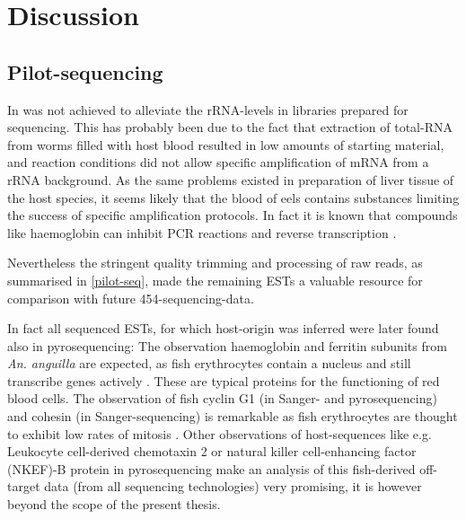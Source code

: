 
\chapter{Discussion} %



\ifpdf
    \graphicspath{{7_discussion/figures/PNG/}{7_discussion/figures/PDF/}{7_discussion/figures/}}
\else
    \graphicspath{{7_discussion/figures/EPS/}{7_discussion/figures/}}
\fi



\section{Pilot-sequencing}
\label{sec:sanger-pil}

In was not achieved to alleviate the rRNA-levels in libraries prepared
for sequencing. This has probably been due to the fact that extraction
of total-RNA from worms filled with host blood resulted in low amounts
of starting material, and reaction conditions did not allow specific
amplification of mRNA from a rRNA background. As the same problems
existed in preparation of liver tissue of the host species, it seems
likely that the blood of eels contains substances limiting the success
of specific amplification protocols. In fact it is known that
compounds like haemoglobin can inhibit PCR reactions
\cite{pmid9327537} and reverse transcription \cite{pmid16109794}.

Nevertheless the stringent quality trimming and processing of raw
reads, as summarised in \ref{pilot-seq}, made the remaining ESTs a
valuable resource for comparison with future 454-sequencing-data.

In fact all sequenced ESTs, for which host-origin was inferred were
later found also in pyrosequencing: The observation haemoglobin and
ferritin subunits from \textit{An. anguilla} are expected, as fish
erythrocytes contain a nucleus and still transcribe genes actively
\cite{pmid20614118}. These are typical proteins for the functioning of
red blood cells. The observation of fish cyclin G1 (in Sanger- and
pyrosequencing) and cohesin (in Sanger-sequencing) is remarkable as
fish erythrocytes are thought to exhibit low rates of mitosis
\cite{pmid7506383}. Other observations of host-sequences like
e.g. Leukocyte cell-derived chemotaxin 2 or natural killer
cell-enhancing factor (NKEF)-B protein in pyrosequencing make an
analysis of this fish-derived off-target data (from all sequencing
technologies) very promising, it is however beyond the scope of the
present thesis.

